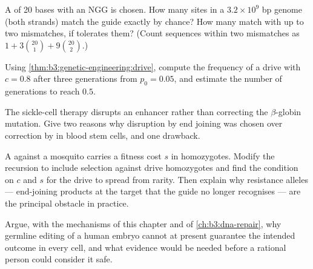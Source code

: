 \begin{exercise}[$\star\star$]\label{exo:b3:genetic-engineering:8}
A  of 20 bases with an NGG  is chosen. How many sites in a
$3.2\times 10^{9}$ bp genome (both strands) match the guide exactly by
chance? How many match with up to two mismatches, if  tolerates
them? (Count sequences within two mismatches as $1 + 3\binom{20}{1} +
9\binom{20}{2}$.)
\end{exercise}

\begin{exercise}[$\star\star$]\label{exo:b3:genetic-engineering:9}
Using \cref{thm:b3:genetic-engineering:drive}, compute the frequency of
a drive with $c = 0.8$ after three generations from $p_{0} = 0.05$, and
estimate the number of generations to reach $0.5$.
\end{exercise}

\begin{exercise}[$\star\star\star$]\label{exo:b3:genetic-engineering:10}
The sickle-cell therapy disrupts an enhancer rather than correcting the
$\beta$-globin mutation. Give two reasons why disruption by end joining
was chosen over correction by  in blood stem
cells, and one drawback.
\end{exercise}

\begin{exercise}[$\star\star\star$]\label{exo:b3:genetic-engineering:11}
A  against a mosquito carries a fitness cost $s$ in
homozygotes. Modify the recursion to include selection against drive
homozygotes and find the condition on $c$ and $s$ for the drive to
spread from rarity. Then explain why resistance alleles --- end-joining
products at the target that the guide no longer recognises --- are the
principal obstacle in practice.
\end{exercise}

\begin{exercise}[$\star\star\star$]\label{exo:b3:genetic-engineering:12}
Argue, with the mechanisms of this chapter and of
\cref{ch:b3:dna-repair}, why germline editing of a human embryo cannot
at present guarantee the intended outcome in every cell, and what
evidence would be needed before a rational person could consider it
safe.
\end{exercise}

